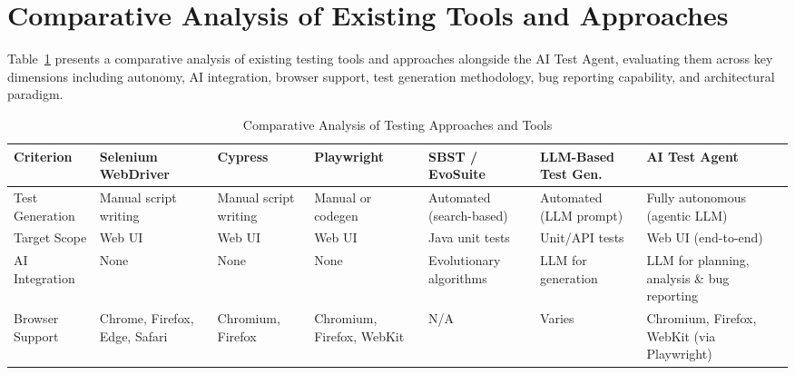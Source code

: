 \section{Comparative Analysis of Existing Tools and Approaches}
\label{sec:comparative_analysis}

Table~\ref{tab:comparative_analysis} presents a comparative analysis of
existing testing tools and approaches alongside the AI Test Agent,
evaluating them across key dimensions including autonomy, AI integration,
browser support, test generation methodology, bug reporting capability,
and architectural paradigm.

\begin{table}[H]
\centering
\caption{Comparative Analysis of Testing Approaches and Tools}
\label{tab:comparative_analysis}
\small
\renewcommand{\arraystretch}{1.25}
\begin{tabularx}{\textwidth}{@{} >{\raggedright\arraybackslash}p{2.1cm}
                                  >{\raggedright\arraybackslash}X
                                  >{\raggedright\arraybackslash}X
                                  >{\raggedright\arraybackslash}X
                                  >{\raggedright\arraybackslash}X
                                  >{\raggedright\arraybackslash}X
                                  >{\raggedright\arraybackslash}X @{}}
\toprule
\textbf{Criterion} &
\textbf{Selenium WebDriver} &
\textbf{Cypress} &
\textbf{Playwright} &
\textbf{SBST / EvoSuite} &
\textbf{LLM-Based Test Gen.} &
\textbf{AI Test Agent} \\
\midrule

Test Generation &
Manual script writing &
Manual script writing &
Manual or codegen &
Automated (search-based) &
Automated (LLM prompt) &
Fully autonomous (agentic LLM) \\

Target Scope &
Web UI &
Web UI &
Web UI &
Java unit tests &
Unit/API tests &
Web UI (end-to-end) \\

AI Integration &
None &
None &
None &
Evolutionary algorithms &
LLM for generation &
LLM for planning, analysis \& bug reporting \\

Browser Support &
Chrome, Firefox, Edge, Safari &
Chromium, Firefox &
Chromium, Firefox, WebKit &
N/A &
Varies &
Chromium, Firefox, WebKit (via Playwright) \\


\end{tabularx}
\end{table}
